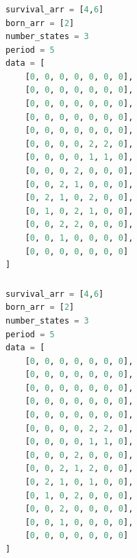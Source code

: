 \documentclass[12pt]{article}
\numberwithin{figure}{section} %
\begin{document}
\noindent\begin{minipage}{.45\textwidth}
\subsubsection{}
\begin{lstlisting}[language = Python]
survival_arr = [4,6]
born_arr = [2]
number_states = 3
period = 5
data = [
    [0, 0, 0, 0, 0, 0, 0],
    [0, 0, 0, 0, 0, 0, 0],
    [0, 0, 0, 0, 0, 0, 0],
    [0, 0, 0, 0, 0, 0, 0],
    [0, 0, 0, 0, 0, 0, 0],
    [0, 0, 0, 0, 2, 2, 0],
    [0, 0, 0, 0, 1, 1, 0],
    [0, 0, 0, 2, 0, 0, 0],
    [0, 0, 2, 1, 0, 0, 0],
    [0, 2, 1, 0, 2, 0, 0],
    [0, 1, 0, 2, 1, 0, 0],
    [0, 0, 2, 2, 0, 0, 0],
    [0, 0, 1, 0, 0, 0, 0],
    [0, 0, 0, 0, 0, 0, 0]
]

\end{lstlisting}
\end{minipage}\hfill
\begin{minipage}{.45\textwidth}
\subsubsection{}
\begin{lstlisting}[language = Python]
survival_arr = [4,6]
born_arr = [2]
number_states = 3
period = 5
data = [
    [0, 0, 0, 0, 0, 0, 0],
    [0, 0, 0, 0, 0, 0, 0],
    [0, 0, 0, 0, 0, 0, 0],
    [0, 0, 0, 0, 0, 0, 0],
    [0, 0, 0, 0, 0, 0, 0],
    [0, 0, 0, 0, 2, 2, 0],
    [0, 0, 0, 0, 1, 1, 0],
    [0, 0, 0, 2, 0, 0, 0],
    [0, 0, 2, 1, 2, 0, 0],
    [0, 2, 1, 0, 1, 0, 0],
    [0, 1, 0, 2, 0, 0, 0],
    [0, 0, 2, 0, 0, 0, 0],
    [0, 0, 1, 0, 0, 0, 0],
    [0, 0, 0, 0, 0, 0, 0]
]
\end{lstlisting}
\end{minipage}
\end{document}
